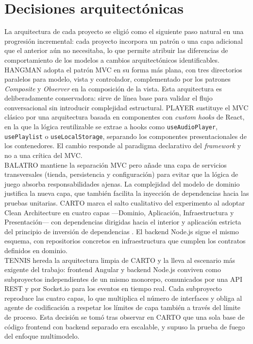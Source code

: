 \section{Decisiones arquitectónicas} \label{sec:arch-decisions}

La arquitectura de cada proyecto se eligió como el siguiente paso natural en una progresión incremental: cada proyecto incorpora un patrón o una capa adicional que el anterior aún no necesitaba, lo que permite atribuir las diferencias de comportamiento de los modelos a cambios arquitectónicos identificables.\\

\ac{HANGMAN} adopta el patrón \ac{MVC} \cite{Reenskaug:1979:MVC} en su forma más plana, con tres directorios paralelos para modelo, vista y controlador, complementado por los patrones \textit{Composite} y \textit{Observer} \cite{Gamma:1994:Design} en la composición de la vista. Esta arquitectura es deliberadamente conservadora: sirve de línea base para validar el flujo conversacional sin introducir complejidad estructural. \ac{PLAYER} sustituye el \ac{MVC} clásico por una arquitectura basada en componentes con \textit{custom hooks} de React, en la que la lógica reutilizable se extrae a hooks como \texttt{useAudioPlayer}, \texttt{usePlaylist} o \texttt{useLocalStorage}, separando los componentes presentacionales de los contenedores. El cambio responde al paradigma declarativo del \textit{framework} y no a una crítica del \ac{MVC}.\\

\ac{BALATRO} mantiene la separación \ac{MVC} pero añade una capa de servicios transversales (tienda, persistencia y configuración) para evitar que la lógica de juego absorba responsabilidades ajenas. La complejidad del modelo de dominio justifica la nueva capa, que también facilita la inyección de dependencias hacia las pruebas unitarias. \ac{CARTO} marca el salto cualitativo del experimento al adoptar Clean Architecture \cite{Martin:2018:CleanArchitecture} en cuatro capas ---Dominio, Aplicación, Infraestructura y Presentación--- con dependencias dirigidas hacia el interior y aplicación estricta del principio de inversión de dependencias \cite{Martin:2003:Agile}. El backend Node.js sigue el mismo esquema, con repositorios concretos en infraestructura que cumplen los contratos definidos en dominio.\\

\ac{TENNIS} hereda la arquitectura limpia de \ac{CARTO} y la lleva al escenario más exigente del trabajo: frontend Angular y backend Node.js conviven como subproyectos independientes de un mismo monorepo, comunicados por una \ac{API} REST y por Socket.io para los eventos en tiempo real. Cada subproyecto reproduce las cuatro capas, lo que multiplica el número de interfaces y obliga al agente de codificación a respetar los límites de capa también a través del límite de proceso. Esta decisión se tomó tras observar en \ac{CARTO} que una sola base de código frontend con backend separado era escalable, y supuso la prueba de fuego del enfoque multimodelo.\\

